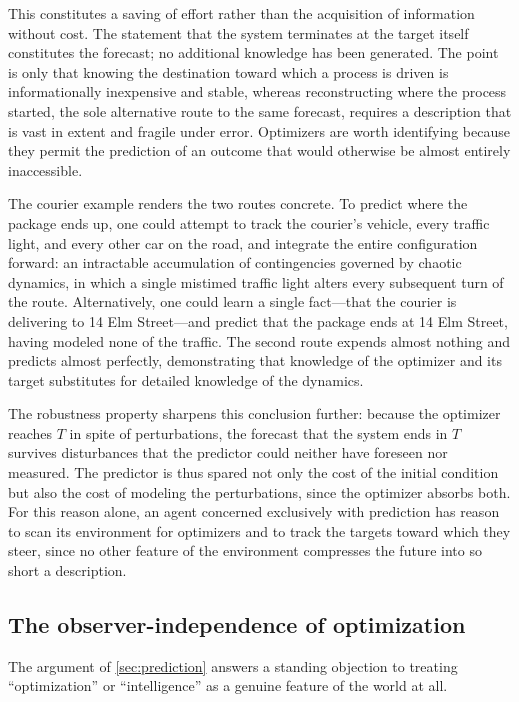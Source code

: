 \documentclass[11pt]{article}
\begin{document}
This constitutes a saving of effort rather than the acquisition of information without cost. The statement that the system terminates at the target itself constitutes the forecast; no additional knowledge has been generated. The point is only that knowing the destination toward which a process is driven is informationally inexpensive and stable, whereas reconstructing where the process started, the sole alternative route to the same forecast, requires a description that is vast in extent and fragile under error. Optimizers are worth identifying because they permit the prediction of an outcome that would otherwise be almost entirely inaccessible.

The courier example renders the two routes concrete. To predict where the package ends up, one could attempt to track the courier's vehicle, every traffic light, and every other car on the road, and integrate the entire configuration forward: an intractable accumulation of contingencies governed by chaotic dynamics, in which a single mistimed traffic light alters every subsequent turn of the route. Alternatively, one could learn a single fact---that the courier is delivering to 14 Elm Street---and predict that the package ends at 14 Elm Street, having modeled none of the traffic. The second route expends almost nothing and predicts almost perfectly, demonstrating that knowledge of the optimizer and its target substitutes for detailed knowledge of the dynamics.

The robustness property sharpens this conclusion further: because the optimizer reaches $T$ in spite of perturbations, the forecast that the system ends in $T$ survives disturbances that the predictor could neither have foreseen nor measured. The predictor is thus spared not only the cost of the initial condition but also the cost of modeling the perturbations, since the optimizer absorbs both. For this reason alone, an agent concerned exclusively with prediction has reason to scan its environment for optimizers and to track the targets toward which they steer, since no other feature of the environment compresses the future into so short a description.

\subsection{The observer-independence of optimization}
\label{sec:objective}

The argument of \cref{sec:prediction} answers a standing objection to treating ``optimization'' or ``intelligence'' as a genuine feature of the world at all.
\end{document}

